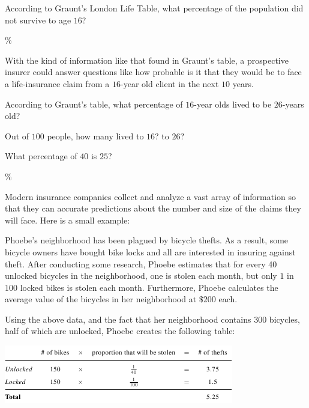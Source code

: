 \documentclass{ximera}
\begin{document}
\begin{question}
According to Graunt's London Life Table, what percentage of the population did not survive to age $16$?

\%
	
\end{question}

With the kind of information like that found in Graunt's table, a prospective insurer could answer questions like how probable is it that they would be to face a life-insurance claim from a $16$-year old client in the next $10$ years.

\begin{question}
According to Graunt's table, what percentage of $16$-year olds lived to be $26$-years old?

\begin{hint}
Out of $100$ people, how many lived to $16$? to $26$?
\end{hint}
\begin{hint}
What percentage of $40$ is $25$? 
\end{hint}
$\%$
	
\end{question}

Modern insurance companies collect and analyze a vast array of information so that they can accurate predictions about the number and size of the claims they will face. Here is a small example:

Phoebe's neighborhood has been plagued by bicycle thefts. As a result, some bicycle owners have bought bike locks and all are interested in insuring against theft. After conducting some research, Phoebe estimates that for every 40 unlocked bicycles in the neighborhood, one is stolen each month, but only $1$ in $100$ locked bikes is stolen each month. Furthermore, Phoebe calculates the average value of the bicycles in her neighborhood at $\$200$ each.

Using the above data, and the fact that her neighborhood contains 300 bicycles, half of which are unlocked, Phoebe creates the following table:

\begin{center}
\includegraphics{InsuranceTable2.png}
\end{center}
\end{document}
